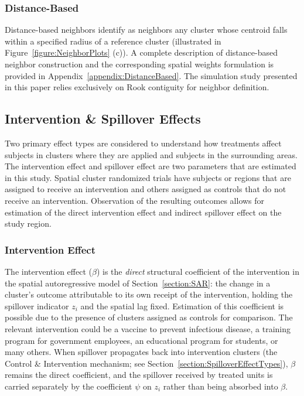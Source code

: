 \documentclass{article}[11pt]
\begin{document}
\subsubsection{Distance-Based}

Distance-based neighbors\cite{fotheringham_sage_2009} identify as neighbors any cluster whose centroid falls within a specified radius of a reference cluster (illustrated in Figure~\ref{figure:NeighborPlots} (c)). A complete description of distance-based neighbor construction and the corresponding spatial weights formulation is provided in Appendix~\ref{appendix:DistanceBased}. The simulation study presented in this paper relies exclusively on Rook contiguity for neighbor definition.

\subsection{Intervention \& Spillover Effects}

Two primary effect types are considered to understand how treatments affect subjects in clusters where they are applied and subjects in the surrounding areas. The intervention effect and spillover effect are two parameters that are estimated in this study. Spatial cluster randomized trials have subjects or regions that are assigned to receive an intervention and others assigned as controls that do not receive an intervention. Observation of the resulting outcomes allows for estimation of the direct intervention effect and indirect spillover effect on the study region.

\subsubsection{Intervention Effect}\label{Section:InterventionEffect}

The intervention effect ($\beta$) is the \textit{direct} structural coefficient of the intervention in the spatial autoregressive model of Section~\ref{section:SAR}: the change in a cluster's outcome attributable to its own receipt of the intervention, holding the spillover indicator $z_i$ and the spatial lag fixed. Estimation of this coefficient is possible due to the presence of clusters assigned as controls for comparison. The relevant intervention could be a vaccine to prevent infectious disease, a training program for government employees, an educational program for students, or many others. When spillover propagates back into intervention clusters (the Control \& Intervention mechanism; see Section~\ref{section:SpilloverEffectTypes}), $\beta$ remains the direct coefficient, and the spillover received by treated units is carried separately by the coefficient $\psi$ on $z_i$ rather than being absorbed into $\beta$.
\end{document}
